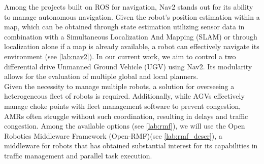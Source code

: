 Among the projects built on ROS\cite{EasyNav}\cite{macenski2020marathon2} for navigation, Nav2 stands out for its ability to manage autonomous navigation\cite{example1nav2}\cite{8735597}. Given the robot’s position estimation within a map, which can be obtained through state estimation utilizing sensor data \cite{MooreStouchKeneralizedEkf2014} in combination with a Simultaneous Localization And Mapping (SLAM)\cite{45466}\cite{Macenski2021}\cite{vslamComparison2021}\cite{sh-p1-prelude} or through localization alone \cite{AMCL_base_teoria}\cite{das2025robotlocalizationmappedenvironment} if a map is already available, a robot can effectively navigate its environment (see \ref{lab:nav2}).
In our current work, we aim to control a two differential drive Unmanned Ground Vehicle (UGV) using Nav2. Its modularity allows for the evaluation of multiple global \cite{macenski2023survey}\cite{10.1007/978-3-031-67295-8_33} and local \cite{580977}\cite{7487277} planners.\\
Given the necessity to manage multiple robots, a solution for overseeing a heterogeneous fleet of robots is required. Additionally, while AGVs effectively manage choke points with fleet management software to prevent congestion, AMRs often struggle without such coordination, resulting in delays and traffic congestion\cite{10797381}.
Among the available options (see \ref{lab:rmf}), we will use the Open Robotics Middleware Framework (Open-RMF)(see \ref{lab:rmf_descr}), a middleware for robots that has obtained substantial interest\cite{salzillo2024robot}\cite{10773345} for its capabilities in traffic management and parallel task execution.
\newpage
